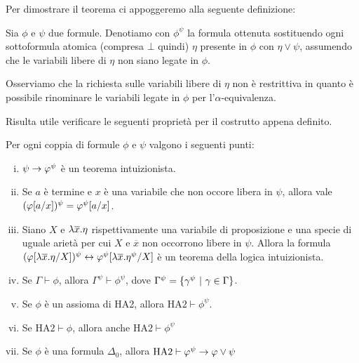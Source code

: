 \documentclass[]{marticle}
\begin{document}
Per dimostrare il teorema ci appoggeremo alla seguente definizione:
\begin{block}[Definizione]
    Sia $\phi$ e $\psi$ due formule. Denotiamo con $\phi^\psi$ la formula
    ottenuta sostituendo ogni sottoformula atomica (compresa $\bot$ quindi)
    $\eta$ presente in $\phi$ con $\eta\lor\psi$, assumendo che le variabili
    libere di $\eta$ non siano legate in $\phi$.
\end{block}

Osserviamo che la richiesta sulle variabili libere di $\eta$ non \`e restrittiva
in quanto \`e possibile rinominare le variabili legate in $\phi$ per
l'$\alpha$-equivalenza.

Risulta utile verificare le seguenti propriet\`a per il costrutto appena
definito.
\begin{block}[Lemma]
    \label{delta0}
    Per ogni coppia di formule $\phi$ e $\psi$ valgono i seguenti punti:
    \begin{enumerate}[(i)]
        \item $\psi\rightarrow \varphi^\psi$ \`e un teorema intuizionista.
        \item Se $a$ \`e termine e $x$ \`e una variabile che non occore libera
            in $\psi$, allora vale $(\varphi[a/x])^\psi = \varphi^\psi[a/x]$.
        \item Siano $X$ e $\lambda \overline{x}.\eta$ rispettivamente una variabile
            di proposizione e una specie di uguale ariet\`a per cui $X$ e
            $\overline{x}$ non occorrono libere in $\psi$. Allora la formula
            $(\varphi[\lambda \overline{x}.\eta/X])^\psi \leftrightarrow
            \varphi^\psi[\lambda \overline{x}.\eta^\psi/X] $ \`e un teorema della
            logica intuizionista.
        \item Se $\Gamma \vdash \phi$, allora $\Gamma^\psi \vdash \phi^\psi$,
            dove $\Gamma^\psi = \{\gamma^\psi \ |\  \gamma \in \Gamma\}$.
        \item Se $\phi$ \`e un assioma di HA2, allora $\text{HA2}\vdash
            \phi^\psi$.
        \item Se $\text{HA2}\vdash \phi$, allora anche $\text{HA2}\vdash
            \phi^\psi$
        \item Se $\phi$ \`e una formula $\Delta_0$, allora $\text{HA2} \vdash
            \varphi^\psi \rightarrow \varphi\lor \psi$
    \end{enumerate}
\end{block}
\end{document}
